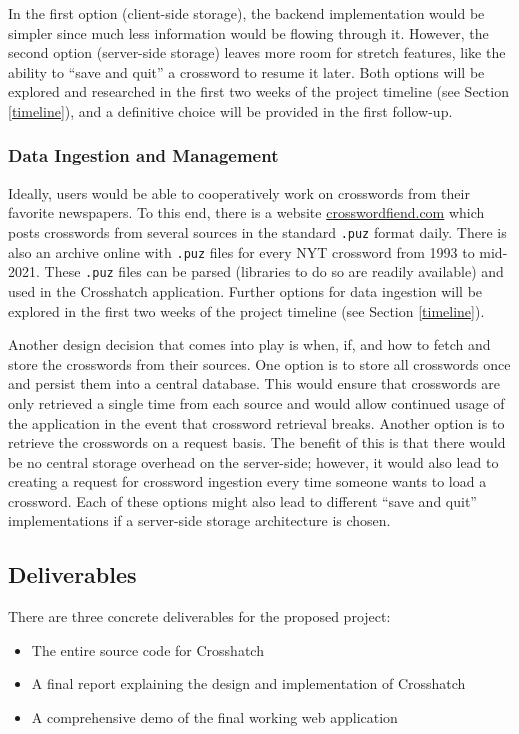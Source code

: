 \documentclass{article}
\begin{document}
In the first option (client-side storage), the backend implementation would be simpler since much less information
would be flowing through it. However, the second option (server-side storage) leaves more room
for stretch features, like the ability to ``save and quit'' a crossword to resume it later.
Both options will be explored and researched in the first two weeks of the project timeline (see Section \ref{timeline}), and a definitive choice will be provided in the first follow-up.

\subsubsection{Data Ingestion and Management}
\label{ingestarch}
Ideally, users would be able to cooperatively work on crosswords from their favorite newspapers.
To this end, there is a website \url{crosswordfiend.com} which posts crosswords
from several sources in the standard \texttt{.puz} format daily. There is also an archive online with \texttt{.puz}
files for every NYT crossword from 1993 to mid-2021. These \texttt{.puz} files can be parsed (libraries to do so
are readily available) and used in the Crosshatch application.
Further options for data ingestion will be explored in the first two weeks of the project timeline
(see Section \ref{timeline}).

Another design decision that comes into play is when, if, and how to fetch and store the crosswords from
their sources. One option is to store all crosswords once and persist them into a central database. This would
ensure that crosswords are only retrieved a single time from each source and would allow continued
usage of the application in the event that crossword retrieval breaks. Another option is to retrieve the
crosswords on a request basis. The benefit of this is that there would be no central storage overhead on the server-side; however, it would also lead to creating a request for crossword ingestion every time someone wants to load a crossword.
Each of these options might also lead to different ``save and quit'' implementations if a server-side storage architecture
is chosen.

\subsection{Deliverables}
There are three concrete deliverables for the proposed project:
\begin{itemize}
  \item The entire source code for Crosshatch
  \item A final report explaining the design and implementation of Crosshatch
  \item A comprehensive demo of the final working web application
\end{itemize}
\end{document}
